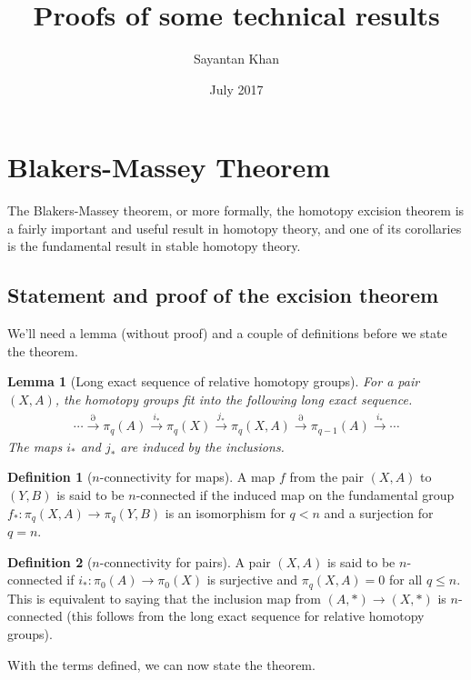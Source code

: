 \documentclass[12pt, notitlepage]{article}
\title{Proofs of some technical results}
\author{Sayantan Khan}
\date{July 2017}
\newtheorem{lem}[thm]{Lemma}
\theoremstyle{definition}
\newtheorem{defn}{Definition}[section]
\begin{document}
\maketitle

\tableofcontents


\newpage

\section{Blakers-Massey Theorem}
\label{sec:blak-mass-theor}

The Blakers-Massey theorem, or more formally, the homotopy excision theorem is a fairly important
and useful result in homotopy theory, and one of its corollaries is the fundamental result in stable
homotopy theory.

\subsection{Statement and proof of the excision theorem}
\label{sec:stat-proof-excis}

We'll need a lemma (without proof) and a couple of definitions before we state the theorem.

\begin{lem}[Long exact sequence of relative homotopy groups]
  For a pair $(X,A)$, the homotopy groups fit into the following long exact sequence.
  \begin{align*}
    \cdots \xrightarrow{\partial} \pi_q(A) \xrightarrow{i_{\ast}} \pi_q(X) \xrightarrow{j_{\ast}}
    \pi_q(X,A) \xrightarrow{\partial} \pi_{q-1}(A) \xrightarrow{i_{\ast}}\cdots
  \end{align*}
  The maps $i_{\ast}$ and $j_{\ast}$ are induced by the inclusions.
\end{lem}

\begin{defn}[$n$-connectivity for maps]
  A map $f$ from the pair $(X,A)$ to $(Y,B)$ is said to be $n$-connected if the induced
  map on the fundamental group $f_{\ast}: \pi_q(X,A) \to \pi_q(Y,B)$ is an isomorphism for
  $q < n$ and a surjection for $q=n$.
\end{defn}

\begin{defn}[$n$-connectivity for pairs]
  A pair $(X,A)$ is said to be $n$-connected if $i_{\ast}: \pi_0(A) \to \pi_0(X)$ is surjective
  and $\pi_q(X,A) = 0$ for all $q \leq n$. This is equivalent to saying that the inclusion map
  from $(A, \ast) \to (X, \ast)$ is $n$-connected (this follows from the long exact sequence
  for relative homotopy groups).
\end{defn}
With the terms defined, we can now state the theorem.
\end{document}
